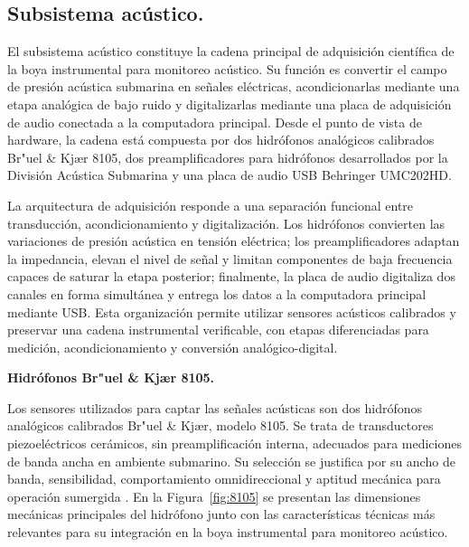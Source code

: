 \subsection{Subsistema acústico.}

El subsistema acústico constituye la cadena principal de adquisición científica de la boya instrumental para monitoreo acústico. Su función es convertir el campo de presión acústica submarina en señales eléctricas, acondicionarlas mediante una etapa analógica de bajo ruido y digitalizarlas mediante una placa de adquisición de audio conectada a la computadora principal. Desde el punto de vista de hardware, la cadena está compuesta por dos hidrófonos analógicos calibrados Br{"u}el \& Kj{\ae}r 8105, dos preamplificadores para hidrófonos desarrollados por la División Acústica Submarina y una placa de audio USB Behringer UMC202HD.

La arquitectura de adquisición responde a una separación funcional entre transducción, acondicionamiento y digitalización. Los hidrófonos convierten las variaciones de presión acústica en tensión eléctrica; los preamplificadores adaptan la impedancia, elevan el nivel de señal y limitan componentes de baja frecuencia capaces de saturar la etapa posterior; finalmente, la placa de audio digitaliza dos canales en forma simultánea y entrega los datos a la computadora principal mediante USB. Esta organización permite utilizar sensores acústicos calibrados y preservar una cadena instrumental verificable, con etapas diferenciadas para medición, acondicionamiento y conversión analógico-digital.

\vspace{10pt}

\noindent \textbf{Hidrófonos Br{"u}el \& Kj{\ae}r 8105.}

Los sensores utilizados para captar las señales acústicas son dos hidrófonos analógicos calibrados Br{"u}el \& Kj{\ae}r, modelo 8105. Se trata de transductores piezoeléctricos cerámicos, sin preamplificación interna, adecuados para mediciones de banda ancha en ambiente submarino. Su selección se justifica por su ancho de banda, sensibilidad, comportamiento omnidireccional y aptitud mecánica para operación sumergida \citep{byk}. En la Figura~\ref{fig:8105} se presentan las dimensiones mecánicas principales del hidrófono junto con las características técnicas más relevantes para su integración en la boya instrumental para monitoreo acústico.

